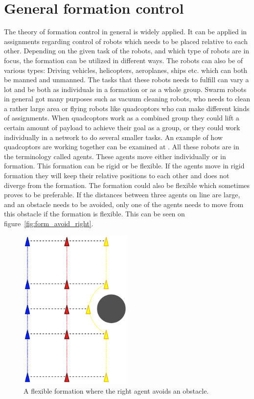 \section{General formation control}

The theory of formation control in general is widely applied. It can be applied in assignments regarding control of robots which needs to be placed relative to each other. Depending on the given task of the robots, and which type of robots are in focus, the formation can be utilized in different ways. The robots can also be of various types: Driving vehicles, helicopters, aeroplanes, ships etc. which can both be manned and unmanned. The tasks that these robots needs to fulfill can vary a lot and be both as individuals in a formation or as a whole group. Swarm robots in general got many purposes such as vacuum cleaning robots, who needs to clean a rather large area or flying robots like quadcoptors who can make different kinds of assignments. When quadcoptors work as a combined group they could lift a certain amount of payload to achieve their goal as a group, or they could work individually in a network to do several smaller tasks. An example of how quadcoptors are working together can be examined at \citep{ethswarm}. All these robots are in the terminology called agents. These agents move either individually or in formation. This formation can be rigid or be flexible. If the agents move in rigid formation they will keep their relative positions to each other and does not diverge from the formation. The formation could also be flexible which sometimes proves to be preferable. If the distances between three agents on line are large, and an obstacle needs to be avoided, only one of the agents needs to move from this obstacle if the formation is flexible. This can be seen on figure~\vref{fig:form_avoid_right}.
\begin{figure}[htbp]
	\centering
	\includegraphics[width=0.5\textwidth]{fig/form_avoid_right}
	\caption{A flexible formation where the right agent avoids an obstacle.}
	\label{fig:form_avoid_right}
\end{figure}

